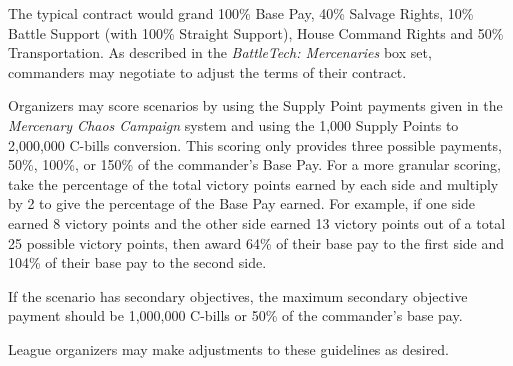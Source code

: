 The typical contract would grand 100\% Base Pay, 40\% Salvage Rights, 10\% Battle Support (with 100\% Straight Support), House Command Rights and 50\% Transportation.
As described in the \emph{BattleTech: Mercenaries} box set, commanders may negotiate to adjust the terms of their contract.

Organizers may score scenarios by using the Supply Point payments given in the \emph{Mercenary Chaos Campaign} system and using the 1,000 Supply Points to 2,000,000 C-bills conversion.
This scoring only provides three possible payments, 50\%, 100\%, or 150\% of the commander's Base Pay.
For a more granular scoring, take the percentage of the total victory points earned by each side and multiply by 2 to give the percentage of the Base Pay earned.
For example, if one side earned 8 victory points and the other side earned 13 victory points out of a total 25 possible victory points, then award 64\% of their base pay to the first side and 104\% of their base pay to the second side.

If the scenario has secondary objectives, the maximum secondary objective payment should be 1,000,000 C-bills or 50\% of the commander's base pay.

League organizers may make adjustments to these guidelines as desired.
